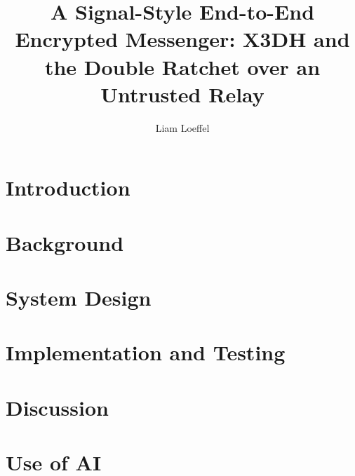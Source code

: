 \documentclass[sigconf,nonacm]{acmart}
\title{A Signal-Style End-to-End Encrypted Messenger: X3DH and the Double Ratchet over an Untrusted Relay}
\author{Liam Loeffel}
\affiliation{\institution{University of Tennessee, Knoxville}\country{USA}}
\begin{document}
\maketitle

\section{Introduction}

\section{Background}

\section{System Design}

\section{Implementation and Testing}

\section{Discussion}

\section*{Use of AI}



\end{document}
